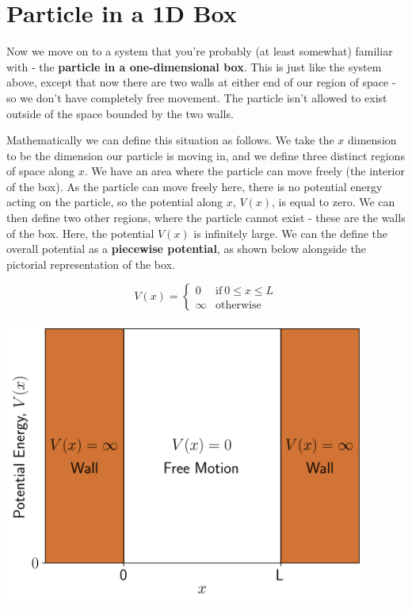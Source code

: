 \documentclass{memoir}[11pt,oneside,a4paper,openany]
\begin{document}
\section{Particle in a 1D Box}
Now we move on to a system that you're probably (at least somewhat) familiar with - the \textbf{particle in a one-dimensional box}. This is just like the system above, except that now there are two walls at either end of our region of space - so we don't have completely free movement. The particle isn't allowed to exist outside of the space bounded by the two walls.

Mathematically we can define this situation as follows. We take the $x$ dimension to be the dimension our particle is moving in, and we define three distinct regions of space along $x$. We have an area where the particle can move freely (the interior of the box). As the particle can move freely here, there is no potential energy acting on the particle, so the potential along $x$, $V(x)$, is equal to zero. We can then define two other regions, where the particle cannot exist - these are the walls of the box. Here, the potential $V(x)$ is infinitely large. We can the define the overall potential as a \textbf{piecewise potential}, as shown below alongside the pictorial representation of the box. 
\begin{minipage}[c]{0.35\textwidth}
	\begin{equation*}
		 V(x) = \begin{cases} 0 &\mbox{if}~ 0\leq x \leq L \\ \infty & \mbox{otherwise} \end{cases}
	\end{equation*}
\end{minipage}
\begin{minipage}[c]{0.64\textwidth}
	\centering
	\includegraphics[width=0.9\textwidth]{particle_box_walls.png}
\end{minipage}
\end{document}
